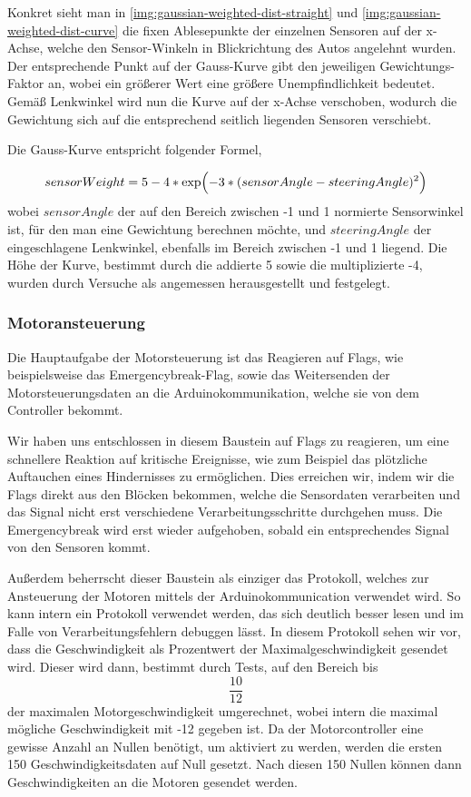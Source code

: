 \documentclass[12pt, a4paper]{scrartcl}
\begin{document}
Konkret sieht man in \autoref{img:gaussian-weighted-dist-straight} und \ref{img:gaussian-weighted-dist-curve} die fixen Ablesepunkte der einzelnen Sensoren auf der x-Achse, welche den Sensor-Winkeln in Blickrichtung des Autos angelehnt wurden. Der entsprechende Punkt auf der Gauss-Kurve gibt den jeweiligen Gewichtungs-Faktor an, wobei ein größerer Wert eine größere Unempfindlichkeit bedeutet. Gemäß Lenkwinkel wird nun die Kurve auf der x-Achse verschoben, wodurch die Gewichtung sich auf die entsprechend seitlich liegenden Sensoren verschiebt.

Die Gauss-Kurve entspricht folgender Formel,

\begin{equation}\label{eq:gaussian-weighted-dist}
sensorWeight= 5 - 4 * \exp\Bigl({-3 * (sensorAngle - steeringAngle)^2}\Bigr)
\end{equation}
wobei $sensorAngle$ der auf den Bereich zwischen -1 und 1 normierte Sensorwinkel ist, für den man eine Gewichtung berechnen möchte, und $steeringAngle$ der eingeschlagene Lenkwinkel, ebenfalls im Bereich zwischen -1 und 1 liegend. Die Höhe der Kurve, bestimmt durch die addierte 5 sowie die multiplizierte -4, wurden durch Versuche als angemessen herausgestellt und festgelegt.


\subsubsection{Motoransteuerung}
Die Hauptaufgabe der Motorsteuerung ist das Reagieren auf Flags, wie beispielsweise das Emergencybreak-Flag, sowie das Weitersenden der Motorsteuerungsdaten  an die Arduinokommunikation, welche sie von dem Controller bekommt.

Wir haben uns entschlossen in diesem Baustein auf Flags zu reagieren, um eine schnellere Reaktion auf kritische Ereignisse, wie zum Beispiel das plötzliche Auftauchen eines Hindernisses zu ermöglichen. Dies erreichen wir, indem wir die Flags direkt aus den Blöcken bekommen, welche die Sensordaten verarbeiten und das Signal nicht erst verschiedene Verarbeitungsschritte durchgehen muss. Die Emergencybreak wird erst wieder aufgehoben, sobald ein entsprechendes Signal von den Sensoren kommt.

Außerdem beherrscht dieser Baustein als einziger das Protokoll, welches zur Ansteuerung der Motoren mittels der Arduinokommunication verwendet wird. So kann intern ein Protokoll verwendet werden, das sich deutlich besser lesen und im Falle von Verarbeitungsfehlern debuggen lässt. In diesem Protokoll sehen wir vor, dass die Geschwindigkeit als Prozentwert der Maximalgeschwindigkeit gesendet wird. Dieser wird dann, bestimmt durch Tests, auf den Bereich bis \[\frac{10}{12}\] der maximalen Motorgeschwindigkeit umgerechnet, wobei intern die maximal mögliche Geschwindigkeit mit -12 gegeben ist. Da der Motorcontroller eine gewisse Anzahl an Nullen benötigt, um aktiviert zu werden, werden die ersten 150 Geschwindigkeitsdaten auf Null gesetzt. Nach diesen 150 Nullen können dann Geschwindigkeiten an die Motoren gesendet werden.
\end{document}

